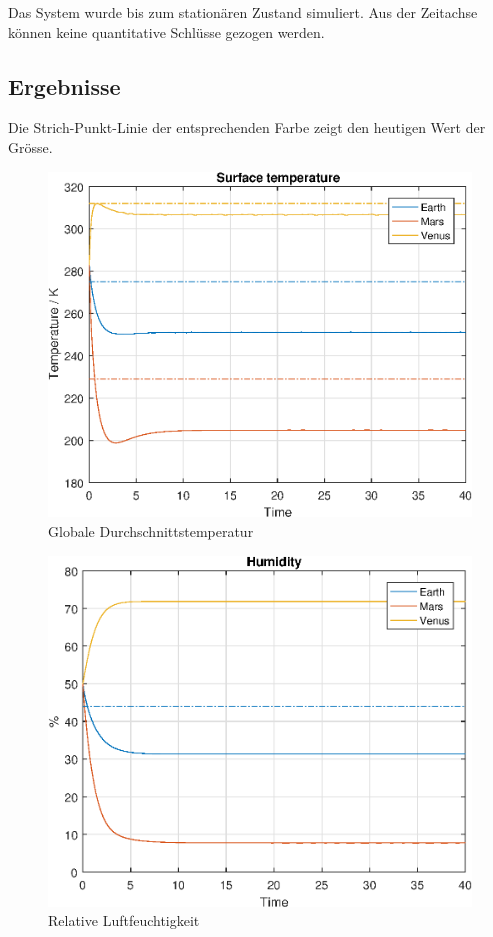 \begin{refsection}
Das System wurde bis zum stationären Zustand simuliert. Aus der Zeitachse können keine quantitative Schlüsse gezogen werden.

\subsection{Ergebnisse}


		Die Strich-Punkt-Linie der entsprechenden Farbe zeigt den heutigen Wert der Grösse. 

		\begin{figure}
			\center
			\includegraphics[height=0.45\textheight]{planeten/Matlab/figures/surfaceTemperature.eps}
			\caption{Globale Durchschnittstemperatur}
		\end{figure}
		
		\begin{figure}
			\center
			\includegraphics[height=0.45\textheight]{planeten/Matlab/figures/humidity.eps}
			\caption{Relative Luftfeuchtigkeit}
		\end{figure}
		

\end{refsection}

